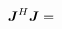 \documentclass[useAMS,usenatbib]{mn2e}
\makeatletter
\newcommand{\mat}[1]{{\bmath{#1}}}
\newcommand{\JJ}{\mat{J}} %
\newcommand{\Matrix}[2]{\left [ \begin{array}{@{}#1@{}}#2\end{array} \right ]}
\newcommand{\AUG}[1]{\bmath{\breve{#1}}}
\newcommand{\Rr}{\AUG{r}}
\numberwithin{equation}{section} %
\providecommand{\DIFdelbegin}{} %
\providecommand{\DIFdelend}{} %
\makeatother
\begin{document}
\DIFdelend \begin{equation}
\label{eq:JHJ:DI:tf}
\JJ^H \JJ = 
\DIFdelbegin %
\end{equation}%






\end{document}
